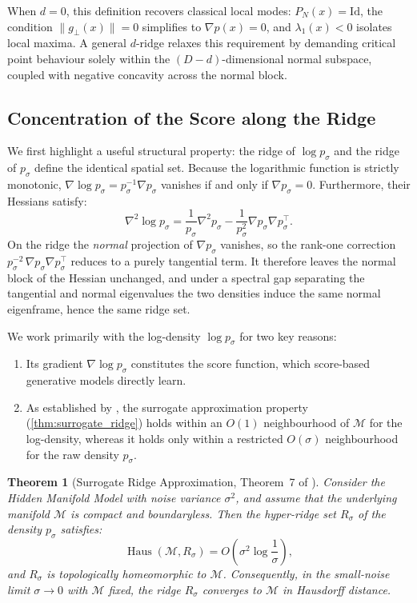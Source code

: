 \documentclass{article}
\newcommand{\M}{\mathcal{M}}
\newcommand{\Id}{\mathrm{Id}}
\theoremstyle{plain}
\newtheorem{theorem}{Theorem}[section]
\theoremstyle{definition}
\theoremstyle{remark}
\begin{document}
When $d = 0$, this definition recovers classical local modes: $P_N(x) = \Id$, the condition $\|g_\perp(x)\| = 0$ simplifies to $\nabla p(x) = 0$, and $\lambda_1(x) < 0$ isolates local maxima. A general $d$-ridge relaxes this requirement by demanding critical point behaviour solely within the $(D-d)$-dimensional normal subspace, coupled with negative concavity across the normal block.

\subsection{Concentration of the Score along the Ridge}

We first highlight a useful structural property: the ridge of $\log p_\sigma$ and the ridge of $p_\sigma$ define the identical spatial set. Because the logarithmic function is strictly monotonic, $\nabla \log p_\sigma = p_\sigma^{-1} \nabla p_\sigma$ vanishes if and only if $\nabla p_\sigma = 0$. Furthermore, their Hessians satisfy:
\begin{equation}
    \nabla^2 \log p_\sigma = \frac{1}{p_\sigma} \nabla^2 p_\sigma - \frac{1}{p_\sigma^2} \nabla p_\sigma \nabla p_\sigma^\top.
\end{equation}
On the ridge the \emph{normal} projection of $\nabla p_\sigma$ vanishes, so the rank-one correction $p_\sigma^{-2}\,\nabla p_\sigma \nabla p_\sigma^\top$ reduces to a purely tangential term. It therefore leaves the normal block of the Hessian unchanged, and under a spectral gap separating the tangential and normal eigenvalues the two densities induce the same normal eigenframe, hence the same ridge set. 

We work primarily with the log-density $\log p_\sigma$ for two key reasons:
\begin{enumerate}
    \item Its gradient $\nabla \log p_\sigma$ constitutes the score function, which score-based generative models directly learn.
    \item As established by \citet{genovese2014nonparametric}, the surrogate approximation property (\autoref{thm:surrogate_ridge}) holds within an $O(1)$ neighbourhood of $\M$ for the log-density, whereas it holds only within a restricted $O(\sigma)$ neighbourhood for the raw density $p_\sigma$.
\end{enumerate}

\begin{theorem}[Surrogate Ridge Approximation, Theorem~7 of \citep{genovese2014nonparametric}]
    \label{thm:surrogate_ridge}
    Consider the Hidden Manifold Model with noise variance $\sigma^2$, and assume that the underlying manifold $\M$ is compact and boundaryless. Then the hyper-ridge set $R_\sigma$ of the density $p_\sigma$ satisfies:
    \begin{equation}
      \operatorname{Haus}(\M, R_\sigma) = O\left(\sigma^2 \log \frac{1}{\sigma}\right),
    \end{equation}
    and $R_\sigma$ is topologically homeomorphic to $\M$. Consequently, in the small-noise limit $\sigma \to 0$ with $\M$ fixed, the ridge $R_\sigma$ converges to $\M$ in Hausdorff distance.
\end{theorem}
\end{document}
